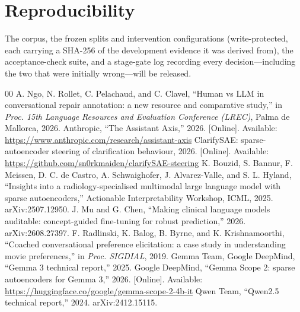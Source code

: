 \documentclass[conference]{IEEEtran}
\begin{document}
\section*{Reproducibility}
The corpus, the frozen splits and intervention configurations (write-protected, each carrying a
SHA-256 of the development evidence it was derived from), the acceptance-check suite, and a
stage-gate log recording every decision---including the two that were initially wrong---will be
released.

\begin{thebibliography}{00}
 A. Ngo, N. Rollet, C. Pelachaud, and C. Clavel, ``Human vs LLM in conversational
repair annotation: a new resource and comparative study,'' in \emph{Proc. 15th Language Resources
and Evaluation Conference (LREC)}, Palma de Mallorca, 2026.
 Anthropic, ``The Assistant Axis,'' 2026. [Online]. Available:
\url{https://www.anthropic.com/research/assistant-axis}
 ClarifySAE: sparse-autoencoder steering of clarification behaviour, 2026.
[Online]. Available: \url{https://github.com/sn0rkmaiden/clarifySAE-steering}
 K. Bouzid, S. Bannur, F. Meissen, D. C. de Castro, A. Schwaighofer,
J. Alvarez-Valle, and S. L. Hyland, ``Insights into a radiology-specialised multimodal large
language model with sparse autoencoders,'' Actionable Interpretability Workshop, ICML, 2025.
arXiv:2507.12950.
 J. Mu and G. Chen, ``Making clinical language models auditable: concept-guided
fine-tuning for robust prediction,'' 2026. arXiv:2608.27397.
 F. Radlinski, K. Balog, B. Byrne, and K. Krishnamoorthi, ``Coached conversational
preference elicitation: a case study in understanding movie preferences,'' in \emph{Proc. SIGDIAL},
2019.
 Gemma Team, Google DeepMind, ``Gemma 3 technical report,'' 2025.
 Google DeepMind, ``Gemma Scope 2: sparse autoencoders for Gemma 3,'' 2026.
[Online]. Available: \url{https://huggingface.co/google/gemma-scope-2-4b-it}
 Qwen Team, ``Qwen2.5 technical report,'' 2024. arXiv:2412.15115.
\end{thebibliography}
\end{document}
